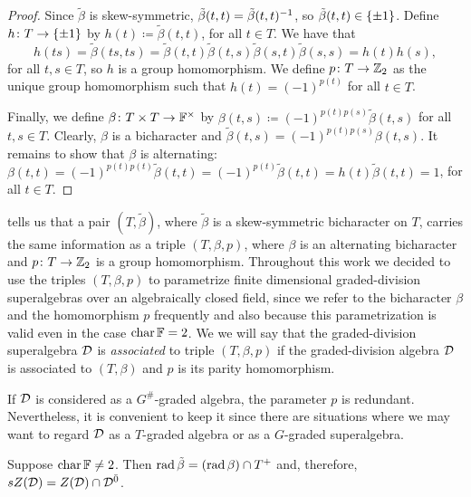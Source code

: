 \begin{proof}
    Since $\tilde\beta$ is skew-symmetric, $\tilde\beta(t,t) = \tilde\beta(t,t)^{-1}$, so $\tilde\beta(t,t)\in \{ \pm 1 \}$. 
    Define $h\colon T \to \{ \pm 1 \}$ by $h(t) \coloneqq \tilde\beta(t,t)$, for all $t\in T$. 
    We have that 
    \[
        h(ts) = \tilde\beta(ts,ts) = \tilde\beta(t,t)\tilde\beta(t,s)\tilde\beta(s,t)\tilde\beta(s,s) = h(t)h(s),
    \] 
    for all $t,s \in T$, so $h$ is a group homomorphism. 
    We define $p\colon T \to \mathbb{Z}_2$ as the unique group homomorphism such that $h(t) = (-1)^{p(t)}$ for all $t\in T$. 
    
    Finally, we define $\beta\colon T\times T \to \mathbb{F}^\times$ by $\beta(t,s) \coloneqq (-1)^{p(t)p(s)}\tilde\beta(t,s)$ for all $t,s\in T$. 
    Clearly, $\beta$ is a bicharacter and $\tilde\beta(t,s) = (-1)^{p(t)p(s)}\beta(t,s)$. 
    It remains to show that $\beta$ is alternating: 
    $\beta(t,t) = (-1)^{p(t)p(t)}\tilde\beta(t,t) = (-1)^{p(t)}\tilde\beta(t,t) = h(t) \tilde\beta(t,t) = 1$, for all $t\in T$.
\end{proof}

 tells us that a pair $(T, \tilde\beta)$, where $\tilde\beta$ is a skew-symmetric bicharacter on $T$, carries the same information as a triple $(T, \beta, p)$, where $\beta$ is an alternating bicharacter and $p\colon T\to \mathbb{Z}_2$ is a group homomorphism. 
Throughout this work we decided to use the triples $(T, \beta, p)$ to parametrize finite dimensional graded-division superalgebras over an algebraically closed field, since we refer to the bicharacter $\beta$ and the homomorphism $p$ frequently and also because this parametrization is valid even in the case $\operatorname{char} \mathbb{F} = 2$. 
We we will say that the graded-division superalgebra $\mathcal{D}$ is \emph{associated} to triple $(T, \beta, p)$ if the graded-division algebra $\mathcal{D}$ is associated to $(T, \beta)$ and $p$ is its parity homomorphism.

\begin{remark}
    If $\mathcal{D}$ is considered as a $G^\#$-graded algebra, the parameter $p$ is redundant. 
    Nevertheless, it is convenient to keep it since there are situations where we may want to regard $\mathcal{D}$ as a $T$-graded algebra or as a $G$-graded superalgebra.
\end{remark}

\begin{lemma}\label{lemma:rad-tilde-beta}
	Suppose $\operatorname{char} \mathbb{F} \neq 2$. 
	Then $\operatorname{rad} \tilde\beta = (\operatorname{rad} \beta)\cap T^+$ and, therefore, $sZ(\mathcal{D}) = Z(\mathcal{D})\cap \mathcal{D}^{\bar0}$.
\end{lemma}

